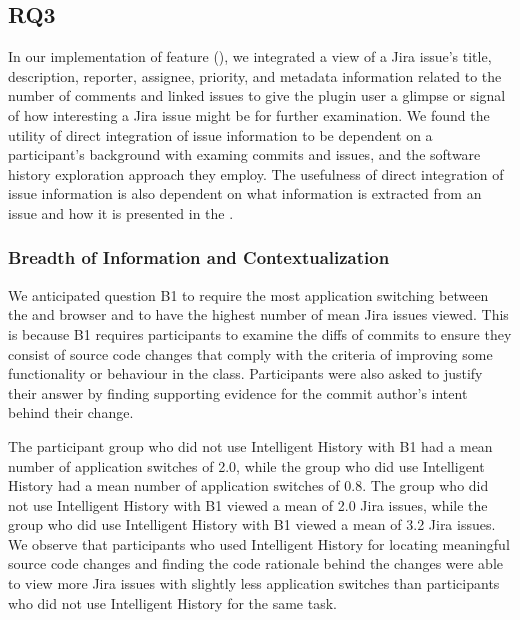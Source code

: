 
\subsection{RQ3}
\label{subsec:RQ3}


In our implementation of feature (), we integrated a view of a Jira issue's title, description, reporter, assignee, priority,
and metadata information related to the number of comments and linked issues to give the plugin user a glimpse or signal of how interesting a Jira issue might be for further examination.
We found the utility of direct integration of issue information to be dependent on a participant's background with examing commits and issues,
and the software history exploration approach they employ.
The usefulness of direct integration of issue information is also dependent on what information is extracted from an issue and how it is presented in the .

\subsubsection{Breadth of Information and Contextualization}

We anticipated question B1 to require the most application switching between the  and browser and to have the highest number of mean Jira issues viewed.
This is because B1 requires participants to examine the diffs of commits to ensure they consist of source code changes that comply with the criteria of improving some functionality or behaviour in the  class.
Participants were also asked to justify their answer by finding supporting evidence for the commit author's intent behind their change.

The participant group who did not use Intelligent History with B1 had a mean number of application switches of 2.0,
while the group who did use Intelligent History had a mean number of application switches of 0.8.
The group who did not use Intelligent History with B1 viewed a mean of 2.0 Jira issues,
while the group who did use Intelligent History with B1 viewed a mean of 3.2 Jira issues.
We observe that participants who used Intelligent History for locating meaningful source code changes and finding the code rationale behind the changes
were able to view more Jira issues with slightly less application switches than participants who did not use Intelligent History for the same task.

